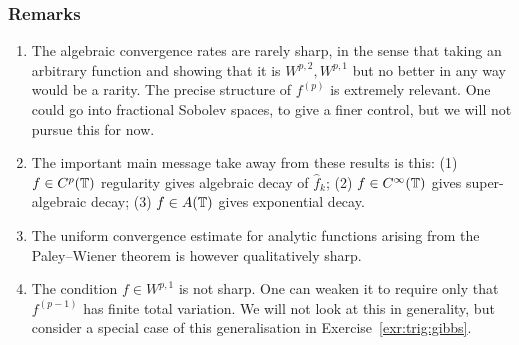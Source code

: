 \subsubsection{Remarks}
\begin{enumerate}
  \item The algebraic convergence rates are rarely sharp, in the sense that taking an arbitrary function and showing that it is $W^{p,2}, W^{p,1}$ but no better in any way would be a rarity. The
    precise structure of $f^{(p)}$ is extremely relevant. One could go into fractional Sobolev spaces, to give a finer control, but we will not pursue this for now. 
  

  \item The important main message take away from these results is this: (1) $f \in C^p(\mathbb{T})$ regularity
  gives algebraic decay of $\hat{f}_k$; (2) $f \in C^\infty(\mathbb{T})$ gives
  super-algebraic decay; (3) $f \in A(\mathbb{T})$ gives exponential decay.


  \item The uniform convergence estimate for analytic functions arising from
  the Paley--Wiener theorem is however qualitatively sharp.

  \item The condition $f \in W^{p,1}$ is not sharp. One can weaken it to require only that $f^{(p-1)}$ has finite total variation. We will not look at this in generality, but consider a special case of this generalisation in Exercise~\ref{exr:trig:gibbs}.
\end{enumerate}


